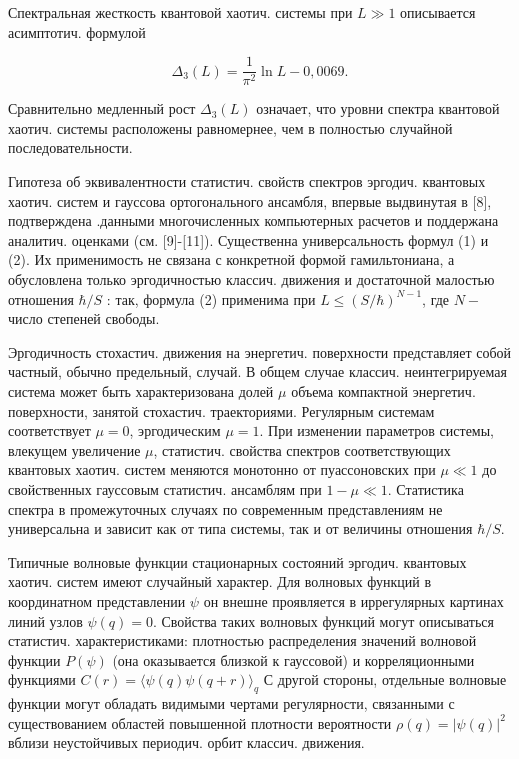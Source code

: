 \documentclass[10pt]{article}
\begin{document}
Спектральная жесткость квантовой хаотич. системы при $L \gg 1$ описывается асимптотич. формулой



\[

\Delta_{3}(L)=\frac{1}{\pi^{2}} \ln L-0,0069 .

\]



Сравнительно медленный рост $\Delta_{3}(L)$ означает, что уровни спектра квантовой хаотич. системы расположены равномернее, чем в полностью случайной последовательности.



Гипотеза об эквивалентности статистич. свойств спектров эргодич. квантовых хаотич. систем и гауссова ортогонального ансамбля, впервые выдвинутая в [8], подтверждена .данными многочисленных компьютерных расчетов и поддержана аналитич. оценками (см. [9]-[11]). Существенна универсальность формул (1) и (2). Их применимость не связана с конкретной формой гамильтониана, а обусловлена только эргодичностью классич. движения и достаточной малостью отношения $\hbar / S$ : так, формула (2) применима при $L \leqslant(S / \hbar)^{N-1}$, где $N-$ число степеней свободы.



Эргодичность стохастич. движения на энергетич. поверхности представляет собой частный, обычно предельный, случай. В общем случае классич. неинтегрируемая система может быть характеризована долей $\mu$ объема компактной энергетич. поверхности, занятой стохастич. траекториями. Регулярным системам соответствует $\mu=0$, эргодическим $\mu=1$. При изменении параметров системы, влекущем увеличение $\mu$, статистич. свойства спектров соответствующих квантовых хаотич. систем меняются монотонно от пуассоновских при $\mu \ll 1$ до свойственных гауссовым статистич. ансамблям при $1-\mu \ll 1$. Статистика спектра в промежуточных случаях по современным представлениям не универсальна и зависит как от типа системы, так и от величины отношения $\hbar / S$.



Типичные волновые функции стационарных состояний эргодич. квантовых хаотич. систем имеют случайный характер. Для волновых функций в координатном представлении $\psi$ он внешне проявляется в иррегулярных картинах линий узлов $\psi(q)=0$. Свойства таких волновых функций могут описываться статистич. характеристиками: плотностью распределения значений волновой функции $P(\psi)$ (она оказывается близкой к гауссовой) и корреляционными функциями $C(r)=\langle\psi(q) \psi(q+r)\rangle_{q}$ С другой стороны, отдельные волновые функции могут обладать видимыми чертами регулярности, связанными с существованием областей повышенной плотности вероятности $\rho(q)=|\psi(q)|^{2}$ вблизи неустойчивых периодич. орбит классич. движения.
\end{document}
